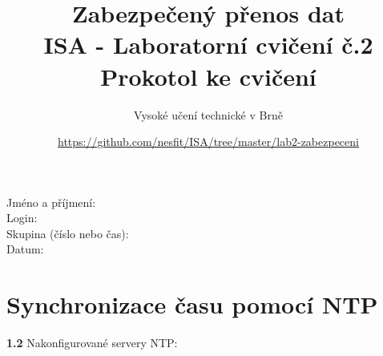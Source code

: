 \documentclass[a4paper,11pt]{article}
\title{Zabezpečený přenos dat\\
{\bf\large ISA - Laboratorní cvičení č.2}\\
{\bf\large Prokotol ke cvičení}}
\author{Vysoké učení technické v Brně}
\date{\url{https://github.com/nesfit/ISA/tree/master/lab2-zabezpeceni}}
\begin{document}
{\let\newpage\relax\maketitle}

Jméno a příjmení:\\
Login:\\
Skupina (číslo nebo čas):\\
Datum:

\section{Synchronizace času pomocí NTP}
{\bf 1.2} Nakonfigurované servery NTP:\\
        
\end{document}

